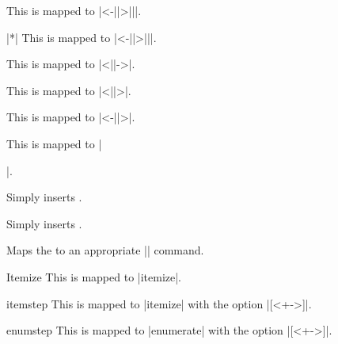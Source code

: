 \begin{command}{\untilSlide{}}
  This is mapped to |\uncover<-||>{||}|.
\end{command}

\begin{command}{\untilSlide|*|}
  This is mapped to |\only<-||>{||}|.
\end{command}

\begin{command}{\FromSlide{}}
  This is mapped to |\onslide<||->|.
\end{command}

\begin{command}{\OnlySlide{}}
  This is mapped to |\onslide<||>|.
\end{command}

\begin{command}{\UntilSlide{}}
  This is mapped to |\onslide<-||>|.
\end{command}

\begin{command}{\slideCaption{}}
  This is mapped to |\date{||}|.
\end{command}

\begin{command}{\fontTitle{}}
  Simply inserts .
\end{command}

\begin{command}{\fontText{}}
  Simply inserts .
\end{command}

\begin{command}{\PDFtransition{}}
  Maps the  to an appropriate |\transxxxx| command.
\end{command}

\begin{environment}{{Itemize}}
  This is mapped to |itemize|.
\end{environment}

\begin{environment}{{itemstep}}
  This is mapped to |itemize| with the option |[<+->]|.
\end{environment}

\begin{environment}{{enumstep}}
  This is mapped to |enumerate| with the option |[<+->]|.
\end{environment}

